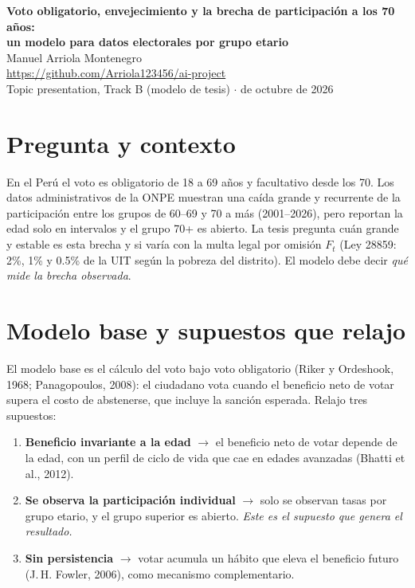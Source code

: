\documentclass[11pt]{article}
\begin{document}
\begin{center}
{\large\bfseries Voto obligatorio, envejecimiento y la brecha de participación a los 70 años:\\ un modelo para datos electorales por grupo etario}\\[4pt]
Manuel Arriola Montenegro \\ {\small\url{https://github.com/Arriola123456/ai-project}} \\ Topic presentation, Track B (modelo de tesis) \quad $\cdot$  de octubre de 2026
\end{center}

\section{Pregunta y contexto}
En el Perú el voto es obligatorio de 18 a 69 años y facultativo desde los 70. Los datos administrativos de la ONPE muestran una caída grande y recurrente de la participación entre los grupos de 60--69 y 70 a más (2001--2026), pero reportan la edad solo en intervalos y el grupo 70+ es abierto. La tesis pregunta cuán grande y estable es esta brecha y si varía con la multa legal por omisión $F_t$ (Ley 28859: 2\%, 1\% y 0.5\% de la UIT según la pobreza del distrito). El modelo debe decir \emph{qué mide la brecha observada}.

\section{Modelo base y supuestos que relajo}
El modelo base es el cálculo del voto bajo voto obligatorio (Riker y Ordeshook, 1968; Panagopoulos, 2008): el ciudadano vota cuando el beneficio neto de votar supera el costo de abstenerse, que incluye la sanción esperada. Relajo tres supuestos:
\begin{enumerate}
\item[(S1)] \textbf{Beneficio invariante a la edad} $\to$ el beneficio neto de votar depende de la edad, con un perfil de ciclo de vida que cae en edades avanzadas (Bhatti et al., 2012).
\item[(S2)] \textbf{Se observa la participación individual} $\to$ solo se observan tasas por grupo etario, y el grupo superior es abierto. \emph{Este es el supuesto que genera el resultado.}
\item[(S3)] \textbf{Sin persistencia} $\to$ votar acumula un hábito que eleva el beneficio futuro (J.\,H. Fowler, 2006), como mecanismo complementario.
\end{enumerate}
\end{document}
